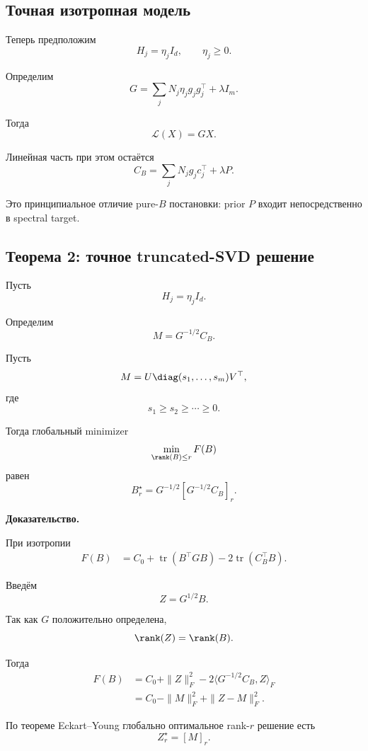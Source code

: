 \subsection{Точная изотропная модель}

Теперь предположим
\[
\boxed{
    H_j=\eta_jI_d,
    \qquad
    \eta_j\ge0.
}
\]

Определим
\[
\boxed{
    G
    =
    \sum_j
    N_j\eta_jg_jg_j^\top
    +
    \lambda I_m.
}
\]

Тогда
\[
\boxed{
    \mathcal L(X)=GX.
}
\]

Линейная часть при этом остаётся
\[
\boxed{
    C_B
    =
    \sum_j
    N_jg_jc_j^\top
    +
    \lambda P.
}
\]

Это принципиальное отличие pure-$B$ постановки:
prior $P$ входит непосредственно в spectral target.

\subsection{Теорема 2: точное truncated-SVD решение}

Пусть
\[
    H_j=\eta_jI_d.
\]

Определим
\[
\boxed{
    M
    =
    G^{-1/2}C_B.
}
\]

Пусть
\[
    M
    =
    U
    \diag(s_1,\ldots,s_m)
    V^\top,
\]
где
\[
    s_1\ge s_2\ge\cdots\ge0.
\]

Тогда глобальный minimizer
\[
    \min_{\rank(B)\le r}F(B)
\]
равен
\[
\boxed{
    B_r^\star
    =
    G^{-1/2}
    [G^{-1/2}C_B]_r.
}
\]

\textbf{Доказательство.}

При изотропии
\[
\begin{aligned}
    F(B)
    &=
    C_0
    +
    \operatorname{tr}(B^\top GB)
    -
    2\operatorname{tr}(C_B^\top B).
\end{aligned}
\]

Введём
\[
    Z=G^{1/2}B.
\]

Так как $G$ положительно определена,
\[
    \rank(Z)=\rank(B).
\]

Тогда
\[
\begin{aligned}
    F(B)
    &=
    C_0
    +
    \|Z\|_F^2
    -
    2
    \langle
        G^{-1/2}C_B,
        Z
    \rangle_F
    \\
    &=
    C_0
    -
    \|M\|_F^2
    +
    \|Z-M\|_F^2.
\end{aligned}
\]

По теореме Eckart--Young
глобально оптимальное rank-$r$ решение есть
\[
    Z_r^\star=[M]_r.
\]

